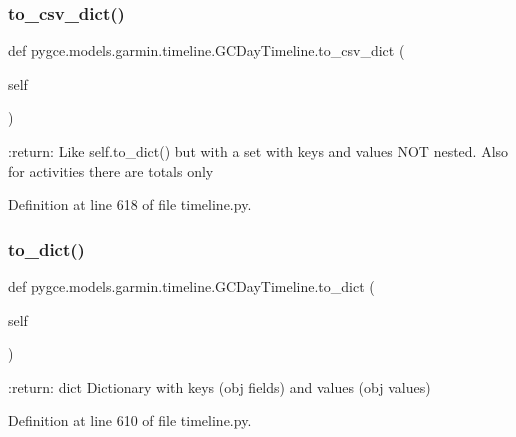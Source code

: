 \subsubsection{\texorpdfstring{to\+\_\+csv\+\_\+dict()}{to\_csv\_dict()}}
{\footnotesize\ttfamily def pygce.\+models.\+garmin.\+timeline.\+G\+C\+Day\+Timeline.\+to\+\_\+csv\+\_\+dict (\begin{DoxyParamCaption}\item[{}]{self }\end{DoxyParamCaption})}

\begin{DoxyVerb}:return: {}
    Like self.to_dict() but with a set with keys and values NOT nested. Also for activities there are totals only
\end{DoxyVerb}
 

Definition at line 618 of file timeline.\+py.

\mbox{\label{classpygce_1_1models_1_1garmin_1_1timeline_1_1_g_c_day_timeline_aea84908a12fe244f70ef0c7d6f9875b7}} 
\subsubsection{\texorpdfstring{to\+\_\+dict()}{to\_dict()}}
{\footnotesize\ttfamily def pygce.\+models.\+garmin.\+timeline.\+G\+C\+Day\+Timeline.\+to\+\_\+dict (\begin{DoxyParamCaption}\item[{}]{self }\end{DoxyParamCaption})}

\begin{DoxyVerb}:return: dict
    Dictionary with keys (obj fields) and values (obj values)
\end{DoxyVerb}
 

Definition at line 610 of file timeline.\+py.

\mbox{\label{classpygce_1_1models_1_1garmin_1_1timeline_1_1_g_c_day_timeline_a45e446687d33554cb53dea0a2d052c1a}} 
